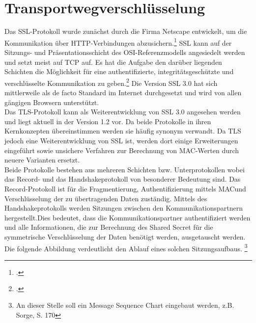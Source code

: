 \chapter{Transportwegverschlüsselung}
Das \ac{SSL}-Protokoll wurde zunächst durch die Firma Netscape entwickelt, um die Kommunikation über \ac{HTTP}-Verbindungen abzusichern.\footcite[S. 796]{Eckert2013} \ac{SSL} kann auf der Sitzungs- und Präsentationsschicht des \ac{OSI}-Referenzmodells angesiedelt werden und setzt meist auf \ac{TCP} auf. Es hat die Aufgabe den darüber liegenden Schichten die Möglichkeit für eine authentifizierte, integritätsgeschützte und verschlüsselte Kommunikation zu geben.\footcite[Vgl.][S. 799 ff.]{Eckert2013}
Die Version \ac{SSL} 3.0 hat sich mittlerweile als de facto Standard im Internet durchgesetzt und wird von allen gängigen Browsern unterstützt.\\
Das \ac{TLS}-Protokoll kann als Weiterentwicklung von \ac{SSL}  3.0 angesehen werden und liegt aktuell in der Version 1.2 vor. Da beide Protokolle in ihren Kernkonzepten übereinstimmen werden sie häufig synonym verwandt. Da \ac{TLS} jedoch eine Weiterentwicklung von \ac{SSL} ist, werden dort einige Erweiterungen eingeführt sowie unsichere Verfahren zur Berechnung von \ac{MAC}-Werten durch neuere Varianten ersetzt.\\
Beide Protokolle bestehen aus mehreren Schichten bzw. Unterprotokollen wobei das Record- und das Handshakeprotokoll von besonderer Bedeutung sind. Das Record-Protokoll ist für die Fragmentierung, Authentifizierung mittels \ac{MAC}und Verschlüsselung der zu übertragenden Daten zuständig. Mittels des Handshakeprotokolls werden Sitzungen zwischen den Kommunikationspartnern hergestellt.Dies bedeutet, dass die Kommunikationspartner authentifiziert werden und alle Informationen, die zur Berechnung des Shared Secret für die symmetrische Verschlüsselung der Daten benötigt werden, ausgetauscht werden. Die folgende Abbildung verdeutlicht den Ablauf eines solchen Sitzungsaufbaus. \footnote{An dieser Stelle soll ein Message Sequence Chart eingebaut werden, z.B. Sorge, S. 170}\\
	